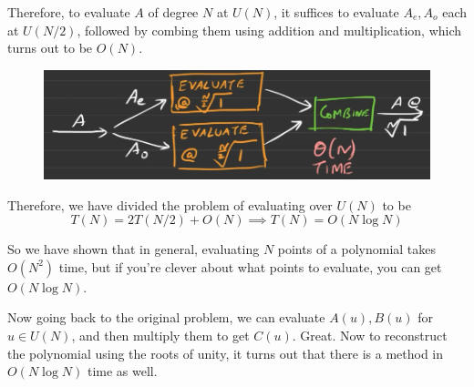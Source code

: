   Therefore, to evaluate $A$ of degree $N$ at $U(N)$, it suffices to evaluate $A_e, A_o$ each at $U(N/2)$, followed by combing them using addition and multiplication, which turns out to be $O(N)$. 

  \begin{figure}[H]
    \centering 
    \includegraphics[scale=0.4]{img/fft.png}
    \caption{} 
    \label{fig:fft}
  \end{figure}

  \begin{algo}
    
    \begin{algorithm}[H]
      \label{alg:unity}
      \begin{algorithmic}
        \Require{}
        \State 
        \EndFunction
      \end{algorithmic}
    \end{algorithm}
  \end{algo}

  Therefore, we have divided the problem of evaluating over $U(N)$ to be 
  \begin{equation}
    T(N) = 2 T(N/2) + O(N) \implies T(N) = O( N \log{N}) 
  \end{equation}

  So we have shown that in general, evaluating $N$ points of a polynomial takes $O(N^2)$ time, but if you're clever about what points to evaluate, you can get $O(N \log N)$. 

  Now going back to the original problem, we can evaluate $A(u), B(u)$ for $u \in U(N)$, and then multiply them to get $C(u)$. Great. Now to reconstruct the polynomial using the roots of unity, it turns out that there is a method in $O(N \log{N})$ time as well. 

